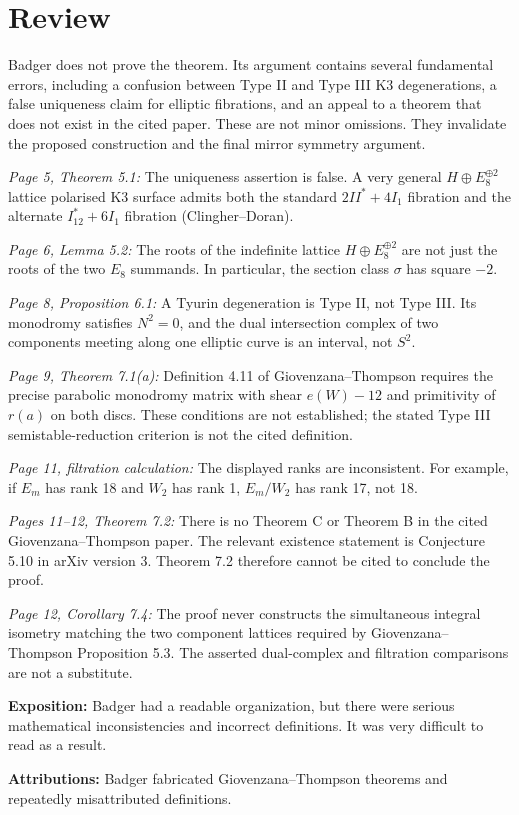 \documentclass[11pt]{article}
\begin{document}
\maketitle

\section{Review}
{\color{gray}

Badger does not prove the theorem. Its argument contains several fundamental errors, including a confusion between Type II and Type III K3 degenerations, a false uniqueness claim for elliptic fibrations, and an appeal to a theorem that does not exist in the cited paper.
These are not minor omissions. They invalidate the proposed construction and the final mirror symmetry argument.

{\em Page 5, Theorem 5.1:}
The uniqueness assertion is false. A very general $H\oplus E_8^{\oplus2}$ lattice polarised K3 surface admits both the standard $2 II^* + 4 I_1$ fibration and the alternate $I_{12}^* + 6 I_1$ fibration (Clingher–Doran).

{\em Page 6, Lemma 5.2:}
The roots of the indefinite lattice $H \oplus E_8^{\oplus 2}$ are not just the roots of the two $E_8$ summands. In particular, the section class $\sigma$ has square $-2$.

{\em Page 8, Proposition 6.1:}
A Tyurin degeneration is Type II, not Type III. Its monodromy satisfies $N^2 = 0$, and the dual intersection complex of two components meeting along one elliptic curve is an interval, not $S^2$.

{\em Page 9, Theorem 7.1(a):}
Definition 4.11 of Giovenzana–Thompson requires the precise parabolic monodromy matrix with shear $e(W) - 12$ and primitivity of $r(a)$ on both discs. These conditions are not established; the stated Type III semistable-reduction criterion is not the cited definition.

{\em Page 11, filtration calculation:}
The displayed ranks are inconsistent.  For example, if $E_m$ has rank 18 and $W_2$ has rank 1, $E_m/W_2$ has rank 17, not 18. 

{\em Pages 11–12, Theorem 7.2:}
There is no Theorem C or Theorem B in the cited Giovenzana–Thompson paper. The relevant existence statement is Conjecture 5.10 in arXiv version 3. Theorem 7.2 therefore cannot be cited to conclude the proof.

{\em Page 12, Corollary 7.4:}
The proof never constructs the simultaneous integral isometry matching the two component lattices required by Giovenzana–Thompson Proposition 5.3. The asserted dual-complex and filtration comparisons are not a substitute. \vspace{0.125in}

\noindent
{\bf Exposition:}
Badger had a readable organization, but there were serious mathematical inconsistencies and incorrect definitions.  It was very difficult to read as a result. \vspace{0.125in}

\noindent
{\bf Attributions:}
Badger fabricated Giovenzana–Thompson theorems and repeatedly misattributed definitions.
}
\end{document}
